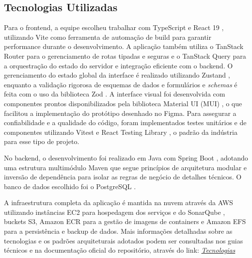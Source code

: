 \subsection{Tecnologias Utilizadas}

Para o frontend, a equipe escolheu trabalhar com TypeScript \cite{Typescript} e React 19 \cite{React}, utilizando Vite \cite{Vite} como ferramenta de automação de build para garantir performance durante o desenvolvimento. A aplicação também utiliza o TanStack Router \cite{TanStackRouter} para o gerenciamento de rotas tipadas e seguras e o TanStack Query \cite{TanStackQuery} para a orquestração do estado do servidor e integração eficiente com o backend. O gerenciamento do estado global da interface é realizado utilizando Zustand \cite{Zustand}, enquanto a validação rigorosa de esquemas de dados e formulários e \textit{schemas} é feita com o uso da biblioteca Zod \cite{Zod}. A interface visual foi desenvolvida com componentes prontos disponibilizados pela biblioteca Material UI (MUI) \cite{MUI}, o que facilitou a implementação do protótipo desenhado no Figma. Para assegurar a confiabilidade e a qualidade do código, foram implementados testes unitários e de componentes utilizando Vitest \cite{Vitest} e React Testing Library \cite{ReactTestingLibrary}, o padrão da indústria para esse tipo de projeto.

No backend, o desenvolvimento foi realizado em Java \cite{Java} com Spring Boot \cite{SpringBoot}, adotando uma estrutura multimódulo Maven \cite{Maven} que segue princípios de arquitetura modular e inversão de dependência para isolar as regras de negócio de detalhes técnicos. O banco de dados escolhido foi o PostgreSQL \cite{PostgreSQL}. 

A infraestrutura completa da aplicação é mantida na nuvem através da AWS \cite{AWS} utilizando instâncias EC2 para hospedagem dos serviços e do SonarQube \cite{SonarQube}, buckets S3, Amazon ECR para a gestão de imagens de containers e Amazon EFS para a persistência e backup de dados. Mais informações detalhadas sobre as tecnologias e os padrões arquiteturais adotados podem ser consultadas nos guias técnicos e na documentação oficial do repositório, através do link:
\href{https://tools.ages.pucrs.br/salespilot/wiki/-/wikis/arquitetura}{\textit{Tecnologias}}

